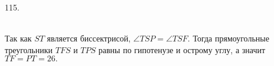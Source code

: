115. \begin{figure}[ht!]
\end{figure}\\
Так как $ST$ является биссектрисой, $\angle TSP=\angle TSF.$ Тогда прямоугольные треугольники $TFS$ и $TPS$ равны по гипотенузе и острому углу, а значит $TF=PT=26.$\\
